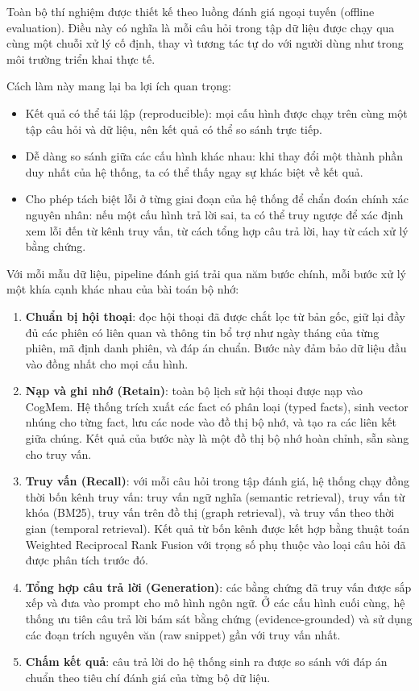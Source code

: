 \documentclass[../main.tex]{subfiles}
\begin{document}
Toàn bộ thí nghiệm được thiết kế theo luồng đánh giá ngoại tuyến (offline evaluation). Điều này có nghĩa là mỗi câu hỏi trong tập dữ liệu được chạy qua cùng một chuỗi xử lý cố định, thay vì tương tác tự do với người dùng như trong môi trường triển khai thực tế. 

Cách làm này mang lại ba lợi ích quan trọng: 
\begin{itemize}
    \item Kết quả có thể tái lập (reproducible): mọi cấu hình được chạy trên cùng một tập câu hỏi và dữ liệu, nên kết quả có thể so sánh trực tiếp.
    \item Dễ dàng so sánh giữa các cấu hình khác nhau: khi thay đổi một thành phần duy nhất của hệ thống, ta có thể thấy ngay sự khác biệt về kết quả.
    \item Cho phép tách biệt lỗi ở từng giai đoạn của hệ thống để chẩn đoán chính xác nguyên nhân: nếu một cấu hình trả lời sai, ta có thể truy ngược để xác định xem lỗi đến từ kênh truy vấn, từ cách tổng hợp câu trả lời, hay từ cách xử lý bằng chứng.
\end{itemize}

Với mỗi mẫu dữ liệu, pipeline đánh giá trải qua năm bước chính, mỗi bước xử lý một khía cạnh khác nhau của bài toán bộ nhớ:

\begin{enumerate}
    \item \textbf{Chuẩn bị hội thoại}: đọc hội thoại đã được chắt lọc từ bản gốc, giữ lại đầy đủ các phiên có liên quan và thông tin bổ trợ như ngày tháng của từng phiên, mã định danh phiên, và đáp án chuẩn. Bước này đảm bảo dữ liệu đầu vào đồng nhất cho mọi cấu hình.
    \item \textbf{Nạp và ghi nhớ (Retain)}: toàn bộ lịch sử hội thoại được nạp vào CogMem. Hệ thống trích xuất các fact có phân loại (typed facts), sinh vector nhúng cho từng fact, lưu các node vào đồ thị bộ nhớ, và tạo ra các liên kết giữa chúng. Kết quả của bước này là một đồ thị bộ nhớ hoàn chỉnh, sẵn sàng cho truy vấn.
    \item \textbf{Truy vấn (Recall)}: với mỗi câu hỏi trong tập đánh giá, hệ thống chạy đồng thời bốn kênh truy vấn: truy vấn ngữ nghĩa (semantic retrieval), truy vấn từ khóa (BM25), truy vấn trên đồ thị (graph retrieval), và truy vấn theo thời gian (temporal retrieval). Kết quả từ bốn kênh được kết hợp bằng thuật toán Weighted Reciprocal Rank Fusion với trọng số phụ thuộc vào loại câu hỏi đã được phân tích trước đó.
    \item \textbf{Tổng hợp câu trả lời (Generation)}: các bằng chứng đã truy vấn được sắp xếp và đưa vào prompt cho mô hình ngôn ngữ. Ở các cấu hình cuối cùng, hệ thống ưu tiên câu trả lời bám sát bằng chứng (evidence-grounded) và sử dụng các đoạn trích nguyên văn (raw snippet) gần với truy vấn nhất.
    \item \textbf{Chấm kết quả}: câu trả lời do hệ thống sinh ra được so sánh với đáp án chuẩn theo tiêu chí đánh giá của từng bộ dữ liệu.
\end{enumerate}
\end{document}
